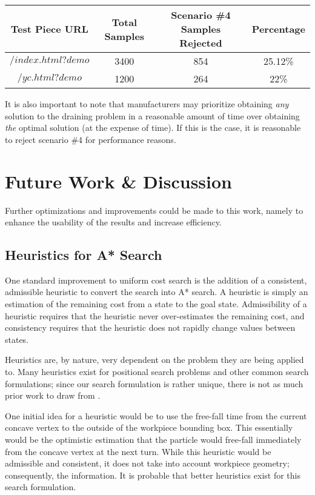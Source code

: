 \begin{table}[H]\label{scenario4rejects}
\centering
\begin{tabular}{|c|c|c|c|}
\hline
Test Piece URL & Total Samples & Scenario \#4 Samples Rejected & Percentage \\ \hline
$/index.html?demo$ & 3400 & 854 & 25.12\%\\
$/yc.html?demo$ & 1200 & 264 & 22\% \\ \hline
\end{tabular}
\end{table}

It is also important to note that manufacturers may prioritize obtaining \emph{any} solution to the draining problem in a reasonable amount of time over obtaining \emph{the} optimal solution (at the expense of time). If this is the case, it is reasonable to reject scenario \#4 for performance reasons.

\section{Future Work \& Discussion}

Further optimizations and improvements could be made to this work, namely to enhance the usability of the results and increase efficiency.

  \subsection{Heuristics for A* Search}

One standard improvement to uniform cost search is the addition of a consistent, admissible heuristic to convert the search into A* search. A heuristic is simply an estimation of the remaining cost from a state to the goal state. Admissibility of a heuristic requires that the heuristic never over-estimates the remaining cost, and consistency requires that the heuristic does not rapidly change values between states.

Heuristics are, by nature, very dependent on the problem they are being applied to. Many heuristics exist for positional search problems and other common search formulations; since our search formulation is rather unique, there is not as much prior work to draw from \cite{heuristics}.

One initial idea for a heuristic would be to use the free-fall time from the current concave vertex to the outside of the workpiece bounding box. This essentially would be the optimistic estimation that the particle would free-fall immediately from the concave vertex at the next turn. While this heuristic would be admissible and consistent, it does not take into account workpiece geometry; consequently, the information. It is probable that better heuristics exist for this search formulation.

